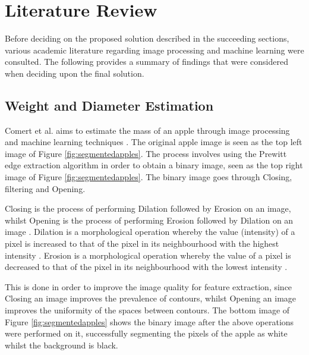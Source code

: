 \documentclass[conference]{IEEEtran}
\begin{document}
\section{Literature Review}
Before deciding on the proposed solution described in the succeeding sections, various academic literature regarding image processing and machine learning were consulted.
The following provides a summary of findings that were considered when deciding upon the final solution.

\subsection{Weight and Diameter Estimation}
Comert et al. aims to estimate the mass of an apple through image processing and machine learning techniques \cite{comert}.
The original apple image is seen as the top left image of Figure \ref{fig:segmentedapples}.
The process involves using the Prewitt edge extraction algorithm in order to obtain a binary image, seen as the top right image of Figure \ref{fig:segmentedapples}.
The binary image goes through Closing, filtering and Opening.

Closing is the process of performing Dilation followed by Erosion on an image, whilst Opening is the process of performing Erosion followed by Dilation on an image \cite{opening,closing}.
Dilation is a morphological operation whereby the value (intensity) of a pixel is increased to that of the pixel in its neighbourhood with the highest intensity \cite{mathworksdilationerosion}.
Erosion is a morphological operation whereby the value of a pixel is decreased to that of the pixel in its neighbourhood with the lowest intensity \cite{mathworksdilationerosion}.

This is done in order to improve the image quality for feature extraction, since Closing an image improves the prevalence of contours, whilst Opening an image improves the uniformity of the spaces between contours.
The bottom image of Figure \ref{fig:segmentedapples} shows the binary image after the above operations were performed on it, successfully segmenting the pixels of the apple as white whilst the background is black.
\end{document}
